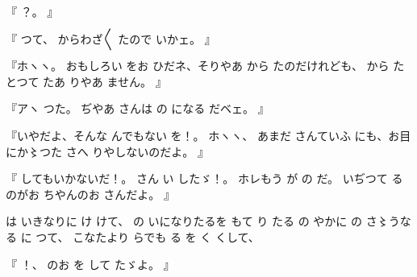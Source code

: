 『
？。
』

『
つて、
からわざ〳〵
たので
いかェ。
』

『ホヽヽ。
おもしろい
をお
ひだネ、そりやあ
から
たのだけれども、
から
たとつて
たあ
りやあ
ません。
』

『アヽ
つた。
ぢやあ
さんは
の
になる
だベェ。
』

『いやだよ、そんな
んでもない
を！。
ホヽヽ、
あまだ
さんていふ
にも、お目にか〻つた
さへ
りやしないのだよ。
』

『
してもいかないだ！。
さん
い
したゞ！。
ホレもう
が
の
だ。
いぢつて
るのがお
ちやんのお
さんだよ。
』

は
いきなりに
け
けて、
の
いになりたるを
もて
り
たる
の
やかに
の
さ〻うなる
に
つて、
こなたより
らでも
る
を
く
くして、

『
！、
のお
を
して
たゞよ。
』

